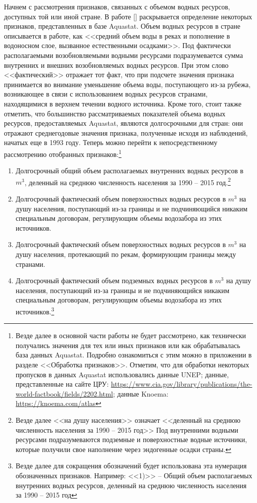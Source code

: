\documentclass[a4paper, 12pt]{article}
\theoremstyle{plain} %
\theoremstyle{definition} %
\theoremstyle{remark} %
\begin{document}
Начнем с рассмотрения признаков, связанных с объемом водных ресурсов, доступных той или иной стране. В работе [\cite{priznaki}] раскрывается определение некоторых признаков, представленных в базе Aquastat. Объем водных ресурсов в стране описывается в работе, как <<средний объем воды в реках и пополнение в водоносном слое, вызванное естественными осадками>>. Под фактически располагаемыми возобновляемыми водными ресурсами подразумевается сумма внутренних и внешних возобновляемых водных ресурсов. При этом слово <<фактический>> отражает тот факт, что при подсчете значения признака принимается во внимание уменьшение объема воды, поступающего из-за рубежа, возникающее в связи с использованием водных ресурсов странами, находящимися в верхнем течении водного источника. Кроме того, стоит также отметить, что большинство рассматриваемых показателей объема водных ресурсов, предоставляемых Aquastat, являются долгосрочными для стран: они отражают среднегодовые значения признака, полученные исходя из наблюдений, начатых еще в 1993 году. Теперь можно перейти к непосредственному рассмотрению отобранных признаков:\footnote{Везде далее в основной части работы не будет рассмотрено, как технически получались значения для тех или иных признаков или как обрабатывалась база данных Aquastat. Подробно ознакомиться с этим можно в приложении в разделе <<Обработка признаков>>. Отметим, что для обработки некоторых пропусков в данных Aquastat использовались данные UNEP; данные, представленные на сайте ЦРУ: \url{https://www.cia.gov/library/publications/the-world-factbook/fields/2202.html}; данные Knoema: \url{https://knoema.com/atlas}}
\begin{enumerate}
	\item Долгосрочный общий объем располагаемых внутренних водных ресурсов в $m^3$, деленный на среднюю численность населения за 1990 – 2015 год.\footnote{Везде далее <<на душу населения>> означает <<деленный на среднюю численность населения за 1990 – 2015 год>> Под внутренними водными ресурсами подразумеваются подземные и поверхностные водные источники, которые получили свое наполнение через эндогенные осадки страны.}
	\item Долгосрочный фактический объем поверхностных водных ресурсов в $m^3$ на душу населения, поступающий из-за границы и не подчиняющийся никаким специальным договорам, регулирующим объемы водозабора из этих источников.
	\item Долгосрочный фактический объем поверхностных водных ресурсов в $m^3$ на душу населения, протекающий по рекам, формирующим границы между странами.
	\item Долгосрочный фактический объем подземных водных ресурсов в $m^3$ на душу населения, поступающий из-за границы и не подчиняющийся никаким специальным договорам, регулирующим объемы водозабора из этих источников.\footnote{Везде далее для сокращения обозначений будет использована эта нумерация обозначенных признаков. Например: <<1)>> -- Общий объем располагаемых внутренних водных ресурсов, деленный на среднюю численность населения за 1990 – 2015 год}
\end{enumerate}
\end{document}
